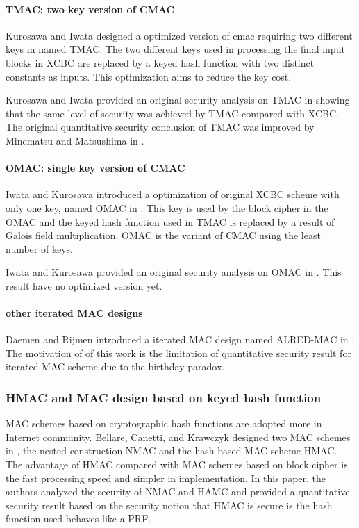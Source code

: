 \documentclass{article}
\begin{document}
\paragraph{TMAC: two key version of CMAC}
Kurosawa and Iwata designed a optimized version of cmac requiring two different keys in \cite{tmac} named TMAC.  
The two different keys used in processing the final input blocks in XCBC are replaced by a keyed hash function with two distinct constants as inputs. This optimization aims to reduce the key cost. 

Kurosawa and Iwata provided an original security analysis on TMAC in \cite{tmac} showing that the same level of security was achieved by TMAC compared with XCBC. The original quantitative security conclusion of TMAC was improved by Minematsu and Matsushima in \cite{new}. 
\paragraph{OMAC: single key version of CMAC}
Iwata and Kurosawa introduced a optimization of original XCBC scheme with only one key, named OMAC in \cite{omac}. This key is used by the block cipher in the OMAC and the keyed hash function used in TMAC is replaced by a result of Galois field multiplication. OMAC is the variant of CMAC using the least number of keys. 

Iwata and Kurosawa provided an original security analysis on OMAC in \cite{omac}. This result have no optimized version yet.
\paragraph{other iterated MAC designs}
Daemen and Rijmen introduced a iterated MAC design named ALRED-MAC in \cite{alred}. The motivation of of this work is the limitation of quantitative security result for iterated MAC scheme due to the birthday paradox. 
 
\subsubsection{HMAC and MAC design based on keyed hash function}
MAC schemes based on cryptographic hash functions are adopted more in Internet community.
Bellare, Canetti, and Krawczyk designed two MAC schemes in \cite{hmac}, the nested construction NMAC and the hash based MAC scheme HMAC. The advantage of HMAC compared with MAC schemes based on block cipher is the fast processing speed and simpler in implementation. 
In this paper, the authors analyzed the security of NMAC and HAMC and provided a quantitative security result based on the security notion that HMAC is secure is the hash function used behaves like a PRF.  
\end{document}
